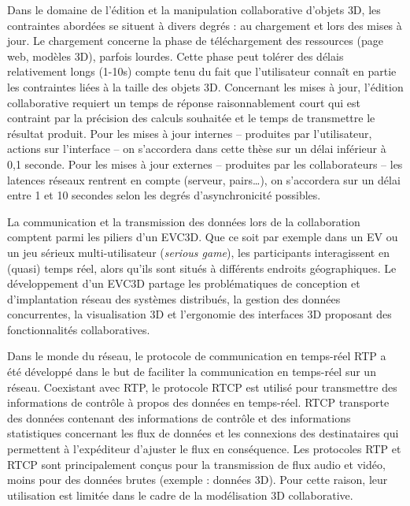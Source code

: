 Dans le domaine de l'édition et la manipulation collaborative 
d'objets \gls{3D}, les contraintes abordées se situent à divers degrés : au 
chargement 
et lors des mises à jour. Le chargement concerne la phase de téléchargement des 
ressources (page web, modèles \gls{3D}), parfois lourdes. Cette phase peut tolérer 
des délais relativement longs (1-10s) compte tenu du fait que l'utilisateur 
connaît en partie les contraintes liées à la taille des objets \gls{3D}. 
Concernant les mises à jour, l'édition collaborative requiert un temps de réponse 
raisonnablement court qui est contraint par la précision des calculs souhaitée 
et le temps de transmettre le résultat produit. Pour les 
mises à jour internes -- produites par l'utilisateur, actions sur l'interface -- on 
s'accordera dans cette thèse sur un délai inférieur à 0,1 seconde. 
Pour les mises à jour externes -- produites par les collaborateurs -- les latences 
réseaux rentrent en compte (serveur, pairs\ldots), on s'accordera sur un délai 
entre 1 et 10 secondes selon les degrés d'asynchronicité possibles. 





La communication et la transmission des données lors de la collaboration 
comptent parmi les piliers d'un \gls{EVC3D}. Que ce soit par exemple 
dans un \gls{EV} ou un jeu sérieux multi-utilisateur (\textit{serious game}), les 
participants interagissent en (quasi) temps réel, alors qu'ils sont situés à 
différents endroits géographiques. 
Le développement d'un \gls{EVC3D} partage les problématiques de conception 
et d'implantation réseau des systèmes distribués, la gestion des données 
concurrentes, la visualisation 3D et l'ergonomie des interfaces 3D proposant 
des fonctionnalités collaboratives.

Dans le monde du réseau, le protocole de communication en temps-réel \gls{RTP} a 
été développé dans le but de faciliter la communication en temps-réel sur un 
réseau. Coexistant avec \gls{RTP}, le protocole \gls{RTCP} est utilisé pour 
transmettre des informations de contrôle à propos des données en temps-réel. 
\gls{RTCP} transporte des données contenant des informations de contrôle et des 
informations statistiques concernant les flux de données et les connexions des 
destinataires qui permettent à l'expéditeur d'ajuster le flux en conséquence. Les 
protocoles \gls{RTP} et \gls{RTCP} sont principalement conçus pour la 
transmission de flux audio et vidéo, moins pour des données brutes (exemple : données \gls{3D}).
Pour cette raison, leur utilisation est limitée dans le cadre 
de la modélisation \gls{3D} collaborative. 


